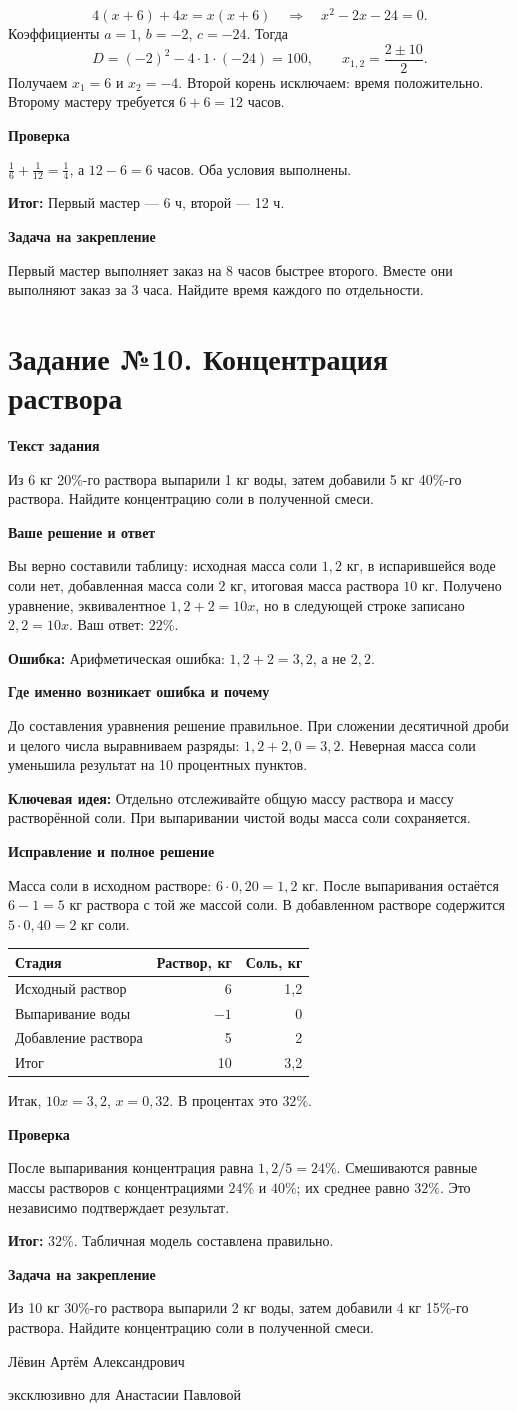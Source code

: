 \documentclass[a4paper,12pt]{article}
\newcommand{\parthead}[1]{\par\smallskip\textbf{#1}\par\nopagebreak[4]}
\newcommand{\err}[1]{\par\textcolor{red!75!black}{\textbf{Ошибка:}} #1\par}
\newcommand{\idea}[1]{\par\textcolor{blue!60!black}{\textbf{Ключевая идея:}} #1\par}
\newcommand{\result}[1]{\par\textcolor{accent}{\textbf{Итог:}} #1\par}
\newcommand{\task}[2]{\clearpage\phantomsection\label{task:#1}\section*{\textcolor{accent}{Задание №#1. #2}}}
\begin{document}
\[4(x+6)+4x=x(x+6)\quad\Longrightarrow\quad x^2-2x-24=0.\]
Коэффициенты $a=1$, $b=-2$, $c=-24$. Тогда
\[D=(-2)^2-4\cdot1\cdot(-24)=100,\qquad x_{1,2}=\frac{2\pm10}{2}.\]
Получаем $x_1=6$ и $x_2=-4$. Второй корень исключаем: время положительно. Второму мастеру требуется $6+6=12$ часов.
\parthead{Проверка}
$\frac16+\frac1{12}=\frac14$, а $12-6=6$ часов. Оба условия выполнены.
\result{Первый мастер --- 6 ч, второй --- 12 ч.}
\parthead{Задача на закрепление}
Первый мастер выполняет заказ на 8 часов быстрее второго. Вместе они выполняют заказ за 3 часа. Найдите время каждого по отдельности.
\task{10}{Концентрация раствора}
\parthead{Текст задания}
Из 6 кг 20\%-го раствора выпарили 1 кг воды, затем добавили 5 кг 40\%-го раствора. Найдите концентрацию соли в полученной смеси.
\parthead{Ваше решение и ответ}
Вы верно составили таблицу: исходная масса соли $1{,}2$ кг, в испарившейся воде соли нет, добавленная масса соли $2$ кг, итоговая масса раствора $10$ кг. Получено уравнение, эквивалентное $1{,}2+2=10x$, но в следующей строке записано $2{,}2=10x$. Ваш ответ: $22\%$.
\err{Арифметическая ошибка: $1{,}2+2=3{,}2$, а не $2{,}2$.}
\parthead{Где именно возникает ошибка и почему}
До составления уравнения решение правильное. При сложении десятичной дроби и целого числа выравниваем разряды: $1{,}2+2{,}0=3{,}2$. Неверная масса соли уменьшила результат на 10 процентных пунктов.
\idea{Отдельно отслеживайте общую массу раствора и массу растворённой соли. При выпаривании чистой воды масса соли сохраняется.}
\parthead{Исправление и полное решение}
Масса соли в исходном растворе: $6\cdot0{,}20=1{,}2$ кг. После выпаривания остаётся $6-1=5$ кг раствора с той же массой соли. В добавленном растворе содержится $5\cdot0{,}40=2$ кг соли.
\begin{center}\small\renewcommand{\arraystretch}{1.25}
\begin{tabularx}{\linewidth}{@{}Xrr@{}}\toprule Стадия & Раствор, кг & Соль, кг\\\midrule Исходный раствор & 6 & 1,2\\ Выпаривание воды & $-1$ & 0\\ Добавление раствора & 5 & 2\\\midrule Итог & 10 & 3,2\\\bottomrule\end{tabularx}\end{center}
Итак, $10x=3{,}2$, $x=0{,}32$. В процентах это $32\%$.
\parthead{Проверка}
После выпаривания концентрация равна $1{,}2/5=24\%$. Смешиваются равные массы растворов с концентрациями $24\%$ и $40\%$; их среднее равно $32\%$. Это независимо подтверждает результат.
\result{$32\%$. Табличная модель составлена правильно.}
\parthead{Задача на закрепление}
Из 10 кг 30\%-го раствора выпарили 2 кг воды, затем добавили 4 кг 15\%-го раствора. Найдите концентрацию соли в полученной смеси.
\vfill\begin{center}\small Лёвин Артём Александрович\par эксклюзивно для Анастасии Павловой\end{center}
\end{document}
